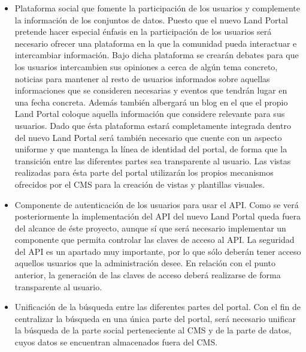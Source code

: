 \begin{itemize}
\item Plataforma social que fomente la participación de los usuarios y complemente la información de los conjuntos de datos.  Puesto que el nuevo Land Portal pretende hacer especial énfasis en la participación de los usuarios será necesario ofrecer una plataforma en la que la comunidad pueda interactuar e intercambiar información.  Bajo dicha plataforma se crearán debates para que los usuarios intercambien sus opiniones a cerca de algún tema concreto, noticias para mantener al resto de usuarios informados sobre aquellas informaciones que se consideren necesarias y eventos que tendrán lugar en una fecha concreta.  Además también albergará un blog en el que el propio Land Portal coloque aquella información que considere relevante para sus usuarios.\newline
Dado que ésta plataforma estará completamente integrada dentro del nuevo Land Portal será también necesario que cuente con un aspecto uniforme y que mantenga la línea de identidad del portal, de forma que la transición entre las diferentes partes sea transparente al usuario.  Las vistas realizadas para ésta parte del portal utilizarán los propios mecanismos ofrecidos por el CMS para la creación de vistas y plantillas visuales. 
\item Componente de autenticación de los usuarios para usar el API.  Como se verá posteriormente la implementación del API del nuevo Land Portal queda fuera del alcance de éste proyecto, aunque sí que será necesario implementar un componente que permita controlar las claves de acceso al API.  La seguridad del API es un apartado muy importante, por lo que sólo deberán tener acceso aquellos usuarios que la administración desee.  En relación con el punto anterior, la generación de las claves de acceso deberá realizarse de forma transparente al usuario.
\item Unificación de la búsqueda entre las diferentes partes del portal.  Con el fin de centralizar la búsqueda en una única parte del portal, será necesario unificar la búsqueda de la parte social perteneciente al CMS y de la parte de datos, cuyos datos se encuentran almacenados fuera del CMS.
\end{itemize}


